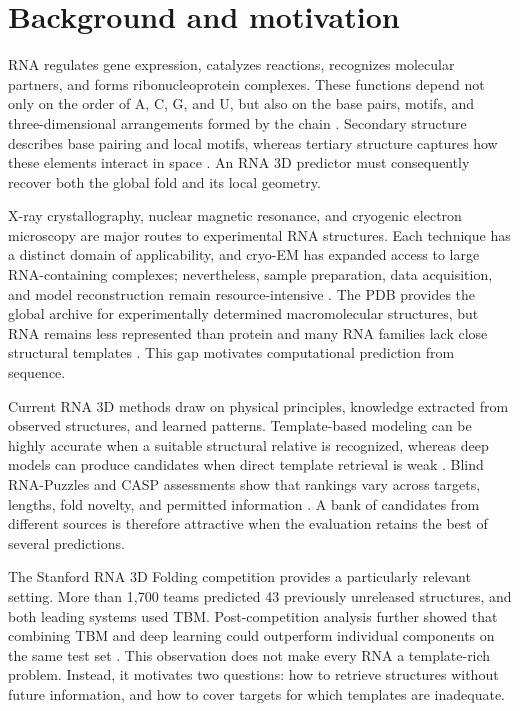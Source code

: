 \documentclass[12pt,a4paper,oneside]{report}
\begin{document}
\section{Background and motivation}

RNA regulates gene expression, catalyzes reactions, recognizes molecular partners, and
forms ribonucleoprotein complexes. These functions depend not only on the order of A, C,
G, and U, but also on the base pairs, motifs, and three-dimensional arrangements formed
by the chain \cite{cao_rna_functions,tinoco_folding,butcher_tertiary}. Secondary
structure describes base pairing and local motifs, whereas tertiary structure captures
how these elements interact in space \cite{tinoco_folding,butcher_tertiary}. An RNA 3D
predictor must consequently recover both the global fold and its local geometry.

X-ray crystallography, nuclear magnetic resonance, and cryogenic electron microscopy
are major routes to experimental RNA structures. Each technique has a distinct domain
of applicability, and cryo-EM has expanded access to large RNA-containing complexes;
nevertheless, sample preparation, data acquisition, and model reconstruction remain
resource-intensive \cite{zhang_experimental_review,ma_cryoem}. The PDB provides the
global archive for experimentally determined macromolecular structures, but RNA remains
less represented than protein and many RNA families lack close structural templates
\cite{pdb_archive,zhang_experimental_review}. This gap motivates computational
prediction from sequence.

Current RNA 3D methods draw on physical principles, knowledge extracted from observed
structures, and learned patterns. Template-based modeling can be highly accurate when a
suitable structural relative is recognized, whereas deep models can produce candidates
when direct template retrieval is weak \cite{rna_progress_review,drfold,rhofoldplus,
drfold2}. Blind RNA-Puzzles and CASP assessments show that rankings vary across targets,
lengths, fold novelty, and permitted information \cite{rna_puzzles,casp15,
state_of_rnart}. A bank of candidates from different sources is therefore attractive
when the evaluation retains the best of several predictions.

The Stanford RNA 3D Folding competition provides a particularly relevant setting. More
than 1,700 teams predicted 43 previously unreleased structures, and both leading systems
used TBM. Post-competition analysis further showed that combining TBM and deep learning
could outperform individual components on the same test set \cite{competition_paper}.
This observation does not make every RNA a template-rich problem. Instead, it motivates
two questions: how to retrieve structures without future information, and how to cover
targets for which templates are inadequate.
\end{document}
